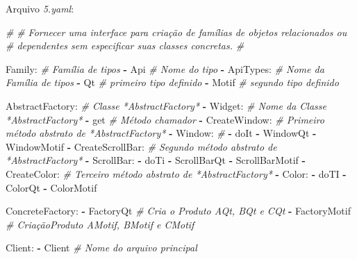 \documentclass[]{article}
\newenvironment{Shaded}{}{}
\newcommand{\KeywordTok}[1]{\textcolor[rgb]{0.00,0.44,0.13}{\textbf{{#1}}}}
\newcommand{\CommentTok}[1]{\textcolor[rgb]{0.38,0.63,0.69}{\textit{{#1}}}}
\newcommand{\FunctionTok}[1]{\textcolor[rgb]{0.02,0.16,0.49}{{#1}}}
\newcommand{\NormalTok}[1]{{#1}}
\begin{document}
\clearpage
Arquivo \emph{5.yaml}:

\begin{Shaded}
\begin{Highlighting}[]
\CommentTok{#}
\CommentTok{# Fornecer uma interface para criação de famílias de objetos relacionados ou}
\CommentTok{# dependentes sem especificar suas classes concretas.}
\CommentTok{#}

\FunctionTok{Family:}                      \CommentTok{# Família de tipos}
\KeywordTok{-} \NormalTok{Api                        }\CommentTok{# Nome do tipo}
\KeywordTok{-} \FunctionTok{ApiTypes:}                  \CommentTok{# Nome da Família de tipos}
    \KeywordTok{-} \NormalTok{Qt                     }\CommentTok{# primeiro tipo definido}
    \KeywordTok{-} \NormalTok{Motif                  }\CommentTok{# segundo tipo definido}

\FunctionTok{AbstractFactory:}             \CommentTok{# Classe *AbstractFactory* }
\KeywordTok{-} \FunctionTok{Widget:}                    \CommentTok{# Nome da Classe *AbstractFactory*}
    \KeywordTok{-} \NormalTok{get                    }\CommentTok{# Método chamador}
    \KeywordTok{-} \FunctionTok{CreateWindow:}          \CommentTok{# Primeiro método abstrato de *AbstractFactory*}
        \KeywordTok{-} \FunctionTok{Window:}            \CommentTok{#}
            \KeywordTok{-} \NormalTok{doIt}
            \KeywordTok{-} \NormalTok{WindowQt}
            \KeywordTok{-} \NormalTok{WindowMotif}
    \KeywordTok{-} \FunctionTok{CreateScrollBar:}       \CommentTok{# Segundo método abstrato de *AbstractFactory*}
        \KeywordTok{-} \FunctionTok{ScrollBar:}
            \KeywordTok{-} \NormalTok{doTi}
            \KeywordTok{-} \NormalTok{ScrollBarQt}
            \KeywordTok{-} \NormalTok{ScrollBarMotif}
    \KeywordTok{-} \FunctionTok{CreateColor:}           \CommentTok{# Terceiro método abstrato de *AbstractFactory*}
        \KeywordTok{-} \FunctionTok{Color:}
            \KeywordTok{-} \NormalTok{doTI}
            \KeywordTok{-} \NormalTok{ColorQt}
            \KeywordTok{-} \NormalTok{ColorMotif}

\FunctionTok{ConcreteFactory:}
\KeywordTok{-} \NormalTok{FactoryQt                  }\CommentTok{# Cria o Produto AQt, BQt e CQt}
\KeywordTok{-} \NormalTok{FactoryMotif               }\CommentTok{# CriaçãoProduto AMotif, BMotif e CMotif}

\FunctionTok{Client:}
\KeywordTok{-} \NormalTok{Client                     }\CommentTok{# Nome do arquivo principal}
\end{Highlighting}
\end{Shaded}
\end{document}
